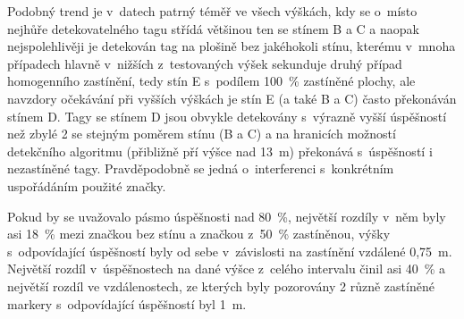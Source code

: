     Podobný trend je v~datech patrný téměř ve všech výškách, kdy se o~místo nejhůře detekovatelného tagu střídá většinou ten se stínem B a C a naopak nejspolehlivěji je detekován tag na plošině bez jakéhokoli stínu, kterému v~mnoha případech hlavně v~nižších z~testovaných výšek sekunduje druhý případ homogenního zastínění, tedy stín E s~podílem 100~\% zastíněné plochy, ale navzdory očekávání při vyšších výškách je stín E (a také B a C) často překonáván stínem D. Tagy se stínem D jsou obvykle detekovány s~výrazně vyšší úspěšností než zbylé 2 se stejným poměrem stínu (B a C) a na hranicích možností detekčního algoritmu (přibližně pří výšce nad 13~m) překonává s~úspěšností i nezastíněné tagy. Pravděpodobně se jedná o~interferenci s~konkrétním uspořádáním použité značky.

    Pokud by se uvažovalo pásmo úspěšnosti nad 80~\%, největší rozdíly v~něm byly asi 18~\% mezi značkou bez stínu a značkou z~50~\% zastíněnou, výšky s~odpovídající úspěšností byly od sebe v~závislosti na zastínění vzdálené 0{,}75~m. Největší rozdíl v~úspěšnostech na dané výšce z~celého intervalu činil asi 40~\% a největší rozdíl ve vzdálenostech, ze kterých byly pozorovány 2 různě zastíněné markery s~odpovídající úspěšností byl 1~m.
    
